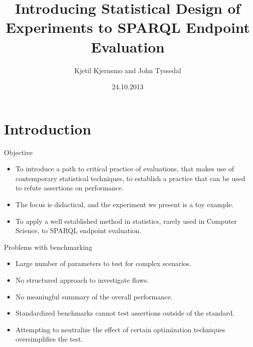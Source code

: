 \documentclass[english,usenames,dvipsnames,aspectratio=169]{beamer}
\begin{document}
\title[DoE in SPARQL Evaluations]{Introducing Statistical Design of Experiments to SPARQL Endpoint Evaluation}
\subtitle{}
\author{Kjetil Kjernsmo and John Tyssedal}
\date{24.10.2013}
\maketitle

\section{Introduction} 

\begin{frame}{Objective}
  \begin{itemize}
  \item To introduce a path to critical practice of evaluations, that makes
use of contemporary statistical techniques, to establish a practice
that can be used to refute assertions on performance.
\item The focus is didactical, and the experiment we present is a toy
example.
\item To apply a well established method in statistics, rarely used in
  Computer Science, to SPARQL endpoint evaluation.

  \end{itemize}

\end{frame}


\begin{frame}{Problems with benchmarking}

\begin{itemize}
\item Large number of parameters to test for complex scenarios.
\item No structured approach to investigate flaws.
\item No meaningful summary of the overall performance.
\item Standardized benchmarks cannot test assertions outside of the
  standard.
\item Attempting to neutralize the effect of certain optimization
  techniques oversimplifies the test.
\end{itemize}
\end{frame}
\end{document}
